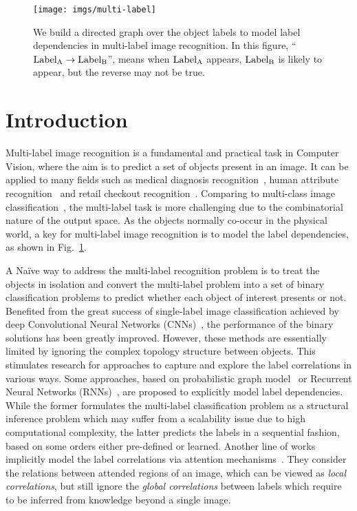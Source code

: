 \documentclass[10pt,twocolumn,letterpaper]{article}
\begin{document}
\begin{figure}
	\centering
	\texttt{[image: imgs/multi-label]}
	\caption{We build a directed graph over the object labels to model label dependencies in multi-label image recognition. In this figure, ``$\rm Label_{A} \rightarrow Label_{B}$'', means when $\rm Label_{A}$ appears, $\rm Label_{B}$ is likely to appear, but the reverse may not be true.}
	\label{fig:multi}
\end{figure}




\section{Introduction}\label{sec:intro}

Multi-label image recognition is a fundamental and practical task in Computer Vision, where the aim is to predict a set of objects present in an image. It can be applied to many fields such as medical diagnosis recognition~\cite{chest}, human attribute recognition~\cite{human} and retail checkout recognition~\cite{retail,rpc}. Comparing to multi-class image classification~\cite{7812753}, the multi-label task is more challenging due to the combinatorial nature of the output space. As the objects normally co-occur in the physical world, a key for multi-label image recognition is to model the label dependencies, as shown in Fig.~\ref{fig:multi}.

A Na\"ive way to address the multi-label recognition problem is to treat the objects in isolation and convert the multi-label problem into a set of binary classification problems to predict whether each object of interest presents or not. Benefited from the great success of  single-label image classification achieved by deep Convolutional Neural Networks (CNNs)~\cite{resnet,verydeep,inception,densenet}, the performance of the binary solutions has been greatly improved. However, these methods are essentially limited by ignoring the complex topology structure between objects. This stimulates research for approaches to capture and explore the label correlations in various ways. Some approaches, based on probabilistic graph model~\cite{tree,conditional} or Recurrent Neural Networks (RNNs)~\cite{cnn-rnn}, are proposed to explicitly model label dependencies. While the former formulates the multi-label classification problem as a structural inference problem which may suffer from a scalability issue due to high computational complexity, the latter predicts the labels in a sequential fashion, based on some orders either pre-defined or learned. Another line of works implicitly model the label correlations via attention mechanisms~\cite{srn,rnn_attention}. They consider the relations between attended regions of an image, which can be viewed as \emph{local correlations}, but still ignore the \emph{global correlations} between labels which require to be inferred from knowledge beyond a single image.   
 
\end{document}
